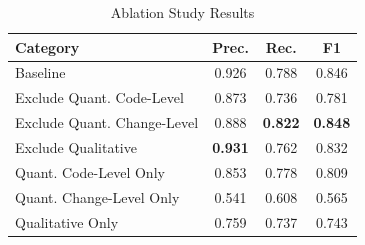 \begin{table}[htb]
\centering
\small
\caption{Ablation Study Results}
\label{tab:ablation_study_result}
\setlength{\tabcolsep}{4pt}
\begin{tabular}{lccc}
\hline
\textbf{Category} & \textbf{Prec.} & \textbf{Rec.} & \textbf{F1} \\
\hline
Baseline                    & 0.926 & 0.788 & 0.846 \\
Exclude Quant. Code-Level   & 0.873 & 0.736 & 0.781 \\
Exclude Quant. Change-Level & 0.888 & \textbf{0.822} & \textbf{0.848} \\
Exclude Qualitative         & \textbf{0.931} & 0.762 & 0.832 \\
Quant. Code-Level Only      & 0.853 & 0.778 & 0.809 \\
Quant. Change-Level Only    & 0.541 & 0.608 & 0.565 \\
Qualitative Only            & 0.759 & 0.737 & 0.743 \\
\hline
\end{tabular}
\end{table}

